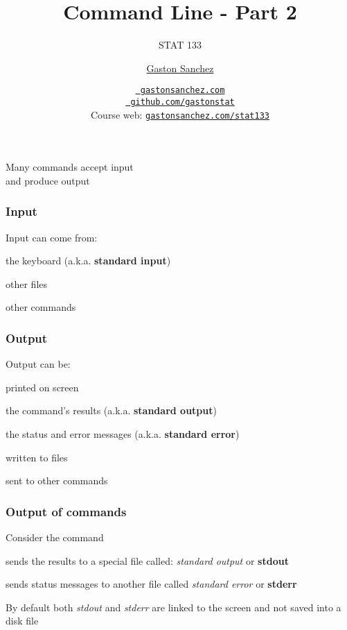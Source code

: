 \documentclass[12pt]{beamer}\usepackage[]{graphicx}\usepackage[]{color}
\title{Command Line - Part 2}
\subtitle{STAT 133}
\author{\href{http://www.gastonsanchez.com}{Gaston Sanchez}}
\institute{Department of Statistics, UC{\textendash}Berkeley}
\date{\href{http://www.gastonsanchez.com}{\tt \scriptsize \color{foreground} gastonsanchez.com}
\\[-4pt]
\href{http://github.com/gastonstat}{\tt \scriptsize \color{foreground} github.com/gastonstat}
\\[-4pt]
{\scriptsize Course web: \href{http://www.gastonsanchez.com/stat133}{\tt gastonsanchez.com/stat133}}
}
\begin{document}
{
  \frame{
    \titlepage
  } 
}


\begin{frame}
\begin{center}
\Huge{}
\end{center}
\end{frame}


\begin{frame}
\frametitle{}

\begin{center}
\Large{Many commands accept {\hilit input} \\ 
and produce {\mdlit output}}
\end{center}

\end{frame}


\begin{frame}
\frametitle{Input}

Input can come from:
\bbi
  \item the keyboard (a.k.a. \textbf{standard input})
  \item other files
  \item other commands
\ei

\end{frame}


\begin{frame}
\frametitle{Output}

Output can be:
\bbi
  \item printed on screen 
  \bi
    \item the command's results (a.k.a. \textbf{standard output})
    \item the status and error messages (a.k.a. \textbf{standard error})
  \ei
  \item written to files
  \item sent to other commands
\ei

\end{frame}


\begin{frame}
\frametitle{Output of commands}

\bi
  \item Consider the command 
  \item {} sends the results to a special file called: \textit{standard output} or \textbf{stdout}
  \item {} sends status messages to another file called \textit{standard error} or \textbf{stderr}
  \item By default both \textit{stdout} and \textit{stderr} are linked to the screen and not saved into a disk file
\ei

\end{frame}
\end{document}

